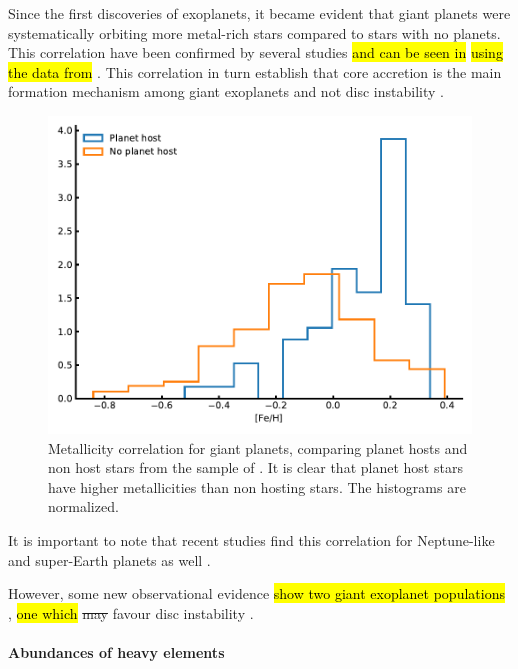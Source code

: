 Since the first discoveries of exoplanets, it became evident that giant planets were systematically
orbiting more metal-rich stars compared to stars with no planets. This correlation have been
confirmed by several studies \citep{Gonzalez1997,Santos2004,Fischer2005,Sousa2008a,Mortier2013b}
\hl{ and can be seen in}  \hl{using the data from} \citet{Sousa2008a}. This
correlation in turn establish that core accretion is the main formation mechanism among giant
exoplanets \citep{Pollack1996,Ida2004,Mordasini2012} and not disc instability \citep{Boss2002}.

\begin{figure}[htpb!]
    \centering
    \includegraphics[width=1.0\linewidth]{figures/fehCorrelation.pdf}
    \caption{Metallicity correlation for giant planets, comparing planet hosts and non host stars
             from the sample of \citet{Sousa2008a}. It is clear that planet host stars have higher
             metallicities than non hosting stars. The histograms are normalized.}
    \label{fig:fehCorrelation}
\end{figure}

It is important to note that recent studies find this correlation for Neptune-like and
super-Earth planets as well \citep{Wang2015,Zhu2016}.

However, some new observational evidence \hl{show two giant exoplanet populations}
\citep{Santos2017}, \hl{one which} \st{may} favour disc instability \citep[see e.g.][]{Nayakshin2017}.

\paragraph{Abundances of heavy elements}

